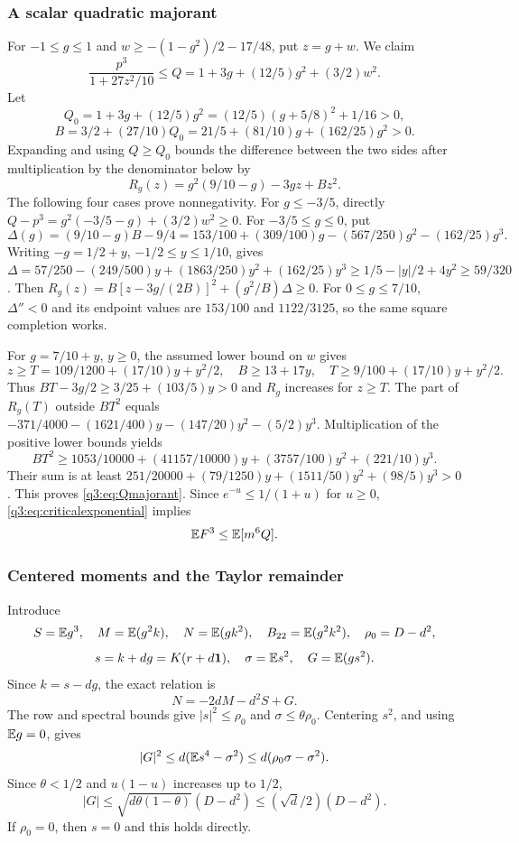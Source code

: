 \subsubsection{A scalar quadratic majorant}
For $-1\le g\le1$ and $w\ge-(1-g^2)/2-17/48$, put $z=g+w$.
We claim
\begin{equation}\label{q3:eq:Qmajorant}
 \frac{p^3}{1+27z^2/10}
 \le Q=1+3g+(12/5)g^2+(3/2)w^2.
\end{equation}
Let
\[
 Q_0=1+3g+(12/5)g^2=(12/5)(g+5/8)^2+1/16>0,
\]
\[
 B=3/2+(27/10)Q_0=21/5+(81/10)g+(162/25)g^2>0.
\]
Expanding and using $Q\ge Q_0$ bounds the difference between the two sides after multiplication by the denominator below by
\[
 R_g(z)=g^2(9/10-g)-3gz+Bz^2.
\]
The following four cases prove nonnegativity.
For $g\le-3/5$, directly
$Q-p^3=g^2(-3/5-g)+(3/2)w^2\ge0$.
For $-3/5\le g\le0$, put
\[
 \Delta(g)=(9/10-g)B-9/4
 =153/100+(309/100)g-(567/250)g^2-(162/25)g^3.
\]
Writing $-g=1/2+y$, $-1/2\le y\le1/10$, gives
$\Delta=57/250-(249/500)y+(1863/250)y^2+(162/25)y^3
\ge1/5-|y|/2+4y^2\ge59/320$.
Then
$R_g(z)=B[z-3g/(2B)]^2+(g^2/B)\Delta\ge0$.
For $0\le g\le7/10$, $\Delta''<0$ and its endpoint values are $153/100$ and $1122/3125$, so the same square completion works.

For $g=7/10+y$, $y\ge0$, the assumed lower bound on $w$ gives
\[
 z\ge T=109/1200+(17/10)y+y^2/2,\quad
 B\ge13+17y,\quad T\ge9/100+(17/10)y+y^2/2.
\]
Thus $BT-3g/2\ge3/25+(103/5)y>0$ and $R_g$ increases for $z\ge T$.
The part of $R_g(T)$ outside $BT^2$ equals
$-371/4000-(1621/400)y-(147/20)y^2-(5/2)y^3$.
Multiplication of the positive lower bounds yields
\[
 BT^2\ge1053/10000+(41157/10000)y+(3757/100)y^2+(221/10)y^3.
\]
Their sum is at least
$251/20000+(79/1250)y+(1511/50)y^2+(98/5)y^3>0$.
This proves \eqref{q3:eq:Qmajorant}. Since $e^{-u}\le1/(1+u)$ for $u\ge0$, \eqref{q3:eq:criticalexponential} implies
\begin{equation}\label{q3:eq:criticalreduction}
 \mathbb E F^3\le\mathbb E[m^6Q].
\end{equation}

\subsubsection{Centered moments and the Taylor remainder}
Introduce
\[
 S=\mathbb E g^3,\quad M=\mathbb E(g^2k),\quad N=\mathbb E(gk^2),\quad
 B_{22}=\mathbb E(g^2k^2),\quad \rho_0=D-d^2,
\]
\[
 s=k+dg=K(r+d\mathbf1),\quad \sigma=\mathbb E s^2,\quad G=\mathbb E(gs^2).
\]
Since $k=s-dg$, the exact relation is
\begin{equation}\label{q3:eq:Nidentity}
 N=-2dM-d^2S+G .
\end{equation}
The row and spectral bounds give $|s|^2\le\rho_0$ and $\sigma\le\theta\rho_0$.
Centering $s^2$, and using $\mathbb E g=0$, gives
\[
 |G|^2\le d(\mathbb E s^4-\sigma^2)\le d(\rho_0\sigma-\sigma^2).
\]
Since $\theta<1/2$ and $u(1-u)$ increases up to $1/2$,
\begin{equation}\label{q3:eq:centeredG}
 |G|\le\sqrt{d\theta(1-\theta)}(D-d^2)\le(\sqrt d/2)(D-d^2).
\end{equation}
If $\rho_0=0$, then $s=0$ and this holds directly.


